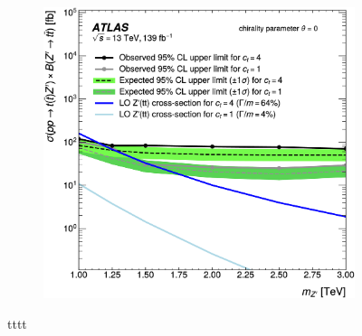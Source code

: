 \documentclass{moriond}
\begin{document}
\begin{figure}[htp]
\begin{subfigure}[b]{0.32\textwidth}
         \caption{}
         \label{fig:bump}
     \end{subfigure}
     \begin{subfigure}[b]{0.32\textwidth}
         \centering
         \includegraphics[width=\textwidth]{tttt}
         \caption{}
         \label{fig:ttttlimits}
     \end{subfigure}
        \caption{tttt}
        \label{fig:tttt}
\end{figure}
\end{document}
